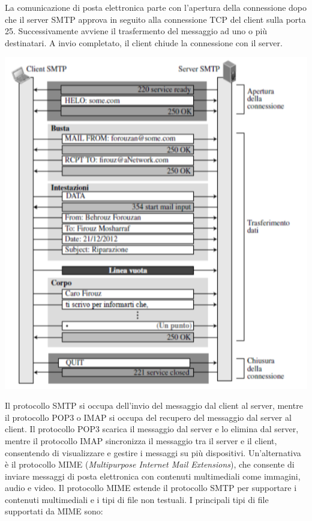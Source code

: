 \documentclass[12pt]{report}
\begin{document}
	La comunicazione di posta elettronica parte con l'apertura della connessione dopo che il server SMTP approva in seguito alla connessione TCP del client sulla porta 25. Successivamente avviene il trasfermento del messaggio ad uno o più destinatari. A invio completato, il client chiude la connessione con il server.
	\begin{center}
		\includegraphics[scale=0.5]{assets/email-comm2.png}
	\end{center}
	Il protocollo SMTP si occupa dell'invio del messaggio dal client al server, mentre il protocollo POP3 o IMAP si occupa del recupero del messaggio dal server al client. Il protocollo POP3 scarica il messaggio dal server e lo elimina dal server, mentre il protocollo IMAP sincronizza il messaggio tra il server e il client, consentendo di visualizzare e gestire i messaggi su più dispositivi.
	Un'alternativa è il protocollo MIME (\textit{Multipurpose Internet Mail Extensions}), che consente di inviare messaggi di posta elettronica con contenuti multimediali come immagini, audio e video. Il protocollo MIME estende il protocollo SMTP per supportare i contenuti multimediali e i tipi di file non testuali. I principali tipi di file supportati da MIME sono:
\end{document}
